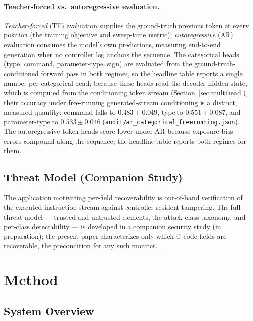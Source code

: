 \documentclass[sensors,article,submit,moreauthors,pdftex]{Definitions/mdpi}
\begin{document}
\paragraph{Teacher-forced vs.\ autoregressive evaluation.} \emph{Teacher-forced} (TF) evaluation supplies the ground-truth previous token at every position (the training objective and sweep-time metric); \emph{autoregressive} (AR) evaluation consumes the model's own predictions, measuring end-to-end generation when no controller log anchors the sequence. The categorical heads (type, command, parameter-type, sign) are evaluated from the ground-truth-conditioned forward pass in both regimes, so the headline table reports a single number per categorical head; because these heads read the decoder hidden state, which is computed from the conditioning token stream (Section~\ref{sec:multihead}), their accuracy under free-running generated-stream conditioning is a distinct, measured quantity: command falls to $0.483 \pm 0.049$, type to $0.551 \pm 0.087$, and parameter-type to $0.533 \pm 0.046$ (\texttt{audit/ar\_categorical\_freerunning.json}). The autoregressive-token heads score lower under AR because exposure-bias errors compound along the sequence; the headline table reports both regimes for them.

\subsection{Threat Model (Companion Study)}
\label{sec:problem-threat-model}

The application motivating per-field recoverability is out-of-band verification of the executed instruction stream against controller-resident tampering. The full threat model --- trusted and untrusted elements, the attack-class taxonomy, and per-class detectability --- is developed in a companion security study (in preparation); the present paper characterizes only which G-code fields are recoverable, the precondition for any such monitor.

\section{Method}
\label{sec:method}

\subsection{System Overview}
\label{sec:system-overview}
\end{document}
